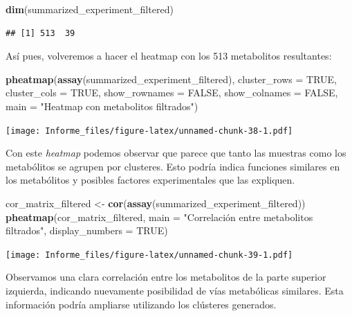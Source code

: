 \documentclass[
]{article}
\newenvironment{Shaded}{\begin{snugshade}}{\end{snugshade}}
\newcommand{\AttributeTok}[1]{\textcolor[rgb]{0.13,0.29,0.53}{#1}}
\newcommand{\ConstantTok}[1]{\textcolor[rgb]{0.56,0.35,0.01}{#1}}
\newcommand{\FunctionTok}[1]{\textcolor[rgb]{0.13,0.29,0.53}{\textbf{#1}}}
\newcommand{\NormalTok}[1]{#1}
\newcommand{\OtherTok}[1]{\textcolor[rgb]{0.56,0.35,0.01}{#1}}
\newcommand{\StringTok}[1]{\textcolor[rgb]{0.31,0.60,0.02}{#1}}
\begin{document}
\begin{Shaded}
\begin{Highlighting}[]
\FunctionTok{dim}\NormalTok{(summarized\_experiment\_filtered)}
\end{Highlighting}
\end{Shaded}

\begin{verbatim}
## [1] 513  39
\end{verbatim}

Así pues, volveremos a hacer el heatmap con los 513 metabolitos
resultantes:

\begin{Shaded}
\begin{Highlighting}[]
\FunctionTok{pheatmap}\NormalTok{(}\FunctionTok{assay}\NormalTok{(summarized\_experiment\_filtered), }\AttributeTok{cluster\_rows =} \ConstantTok{TRUE}\NormalTok{, }\AttributeTok{cluster\_cols =} \ConstantTok{TRUE}\NormalTok{, }
         \AttributeTok{show\_rownames =} \ConstantTok{FALSE}\NormalTok{, }\AttributeTok{show\_colnames =} \ConstantTok{FALSE}\NormalTok{, }\AttributeTok{main =} \StringTok{"Heatmap con metabolitos filtrados"}\NormalTok{)}
\end{Highlighting}
\end{Shaded}

\texttt{[image: Informe\_files/figure-latex/unnamed-chunk-38-1.pdf]}

Con este \emph{heatmap} podemos observar que parece que tanto las
muestras como los metabólitos se agrupen por clusteres. Esto podría
indica funciones similares en los metabólitos y posibles factores
experimentales que las expliquen.

\begin{Shaded}
\begin{Highlighting}[]
\NormalTok{cor\_matrix\_filtered }\OtherTok{\textless{}{-}} \FunctionTok{cor}\NormalTok{(}\FunctionTok{assay}\NormalTok{(summarized\_experiment\_filtered))}
\FunctionTok{pheatmap}\NormalTok{(cor\_matrix\_filtered, }\AttributeTok{main =} \StringTok{"Correlación entre metabolitos filtrados"}\NormalTok{, }\AttributeTok{display\_numbers =} \ConstantTok{TRUE}\NormalTok{)}
\end{Highlighting}
\end{Shaded}

\texttt{[image: Informe\_files/figure-latex/unnamed-chunk-39-1.pdf]}

Observamos una clara correlación entre los metabolitos de la parte
superior izquierda, indicando nuevamente posibilidad de vías metabólicas
similares. Esta información podría ampliarse utilizando los clústeres
generados.
\end{document}
